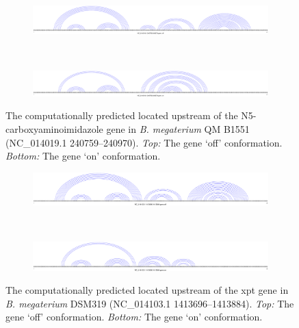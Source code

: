 \begin{figure}[!ht]
\centering
\begin{subfigure}[h]{\textwidth}
\centering
\includegraphics[width=.9\textwidth]{Figures/Ribofinder/NC_014019_1_240759_240970_OFF.pdf}
\end{subfigure} \\
\medskip
\begin{subfigure}[h]{\textwidth}
\centering
\includegraphics[width=.9\textwidth]{Figures/Ribofinder/NC_014019_1_240759_240970_ON.pdf}
\end{subfigure}
\caption[Structures for the putative \rb located upstream of the N5- carboxy\-amino\-imidazole gene in {\em B. megaterium} QM B1551]{The computationally predicted \rb located upstream of the
N5- carboxy\-amino\-imidazole
gene in {\em B. megaterium} QM B1551 (NC\_014019.1 240759--240970).
{\em Top:} The gene `off' conformation. {\em Bottom:} The gene `on' conformation.}
\label{fig:figure:NC_014019_1_240759_240970}
\end{figure}
\medskip

\begin{figure}[!ht]
\centering
\begin{subfigure}[h]{\textwidth}
\centering
\includegraphics[width=.9\textwidth]{Figures/Ribofinder/NC_014103_1_1413696_1413884_OFF.pdf}
\end{subfigure} \\
\medskip
\begin{subfigure}[h]{\textwidth}
\centering
\includegraphics[width=.9\textwidth]{Figures/Ribofinder/NC_014103_1_1413696_1413884_ON.pdf}
\end{subfigure}
\caption[Structures for the putative \rb located upstream of the xpt gene in {\em B. megaterium} DSM319]{The computationally predicted \rb located upstream of the xpt
gene in {\em B. megaterium} DSM319 (NC\_014103.1 1413696--1413884).
{\em Top:} The gene `off' conformation. {\em Bottom:} The gene `on' conformation.}
\label{fig:figure:NC_014103_1_1413696_1413884}
\end{figure}
\medskip

